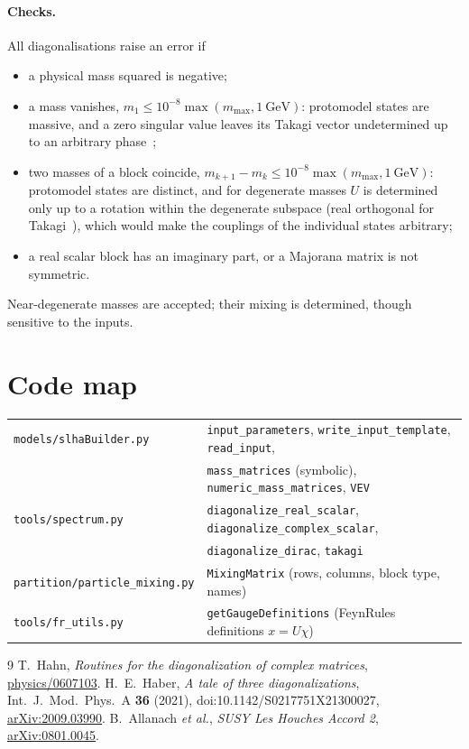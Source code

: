 \documentclass[11pt]{article}
\newcommand{\code}[1]{\texttt{#1}}
\begin{document}
\paragraph{Checks.} All diagonalisations raise an error if
\begin{itemize}
  \item a physical mass squared is negative;
  \item a mass vanishes, $m_1 \le 10^{-8}\max(m_{\max}, 1~\text{GeV})$: protomodel states are
        massive, and a zero singular value leaves its Takagi vector undetermined up to an
        arbitrary phase~\cite{Haber};
  \item two masses of a block coincide, $m_{k+1}-m_k \le 10^{-8}\max(m_{\max},1~\text{GeV})$:
        protomodel states are distinct, and for degenerate masses $U$ is determined only up to
        a rotation within the degenerate subspace (real orthogonal for Takagi~\cite{Haber}),
        which would make the couplings of the individual states arbitrary;
  \item a real scalar block has an imaginary part, or a Majorana matrix is not symmetric.
\end{itemize}
Near-degenerate masses are accepted; their mixing is determined, though sensitive to the
inputs.

\section{Code map}

\begin{center}
\begin{tabular}{ll}
\toprule
\code{models/slhaBuilder.py} & \code{input\_parameters}, \code{write\_input\_template}, \code{read\_input}, \\
                             & \code{mass\_matrices} (symbolic), \code{numeric\_mass\_matrices}, \code{VEV} \\
\code{tools/spectrum.py}     & \code{diagonalize\_real\_scalar}, \code{diagonalize\_complex\_scalar}, \\
                             & \code{diagonalize\_dirac}, \code{takagi} \\
\code{partition/particle\_mixing.py} & \code{MixingMatrix} (rows, columns, block type, names) \\
\code{tools/fr\_utils.py}    & \code{getGaugeDefinitions} (FeynRules definitions $x = U\chi$) \\
\bottomrule
\end{tabular}
\end{center}

\begin{thebibliography}{9}
 T.~Hahn, \emph{Routines for the diagonalization of complex matrices},
  \href{https://arxiv.org/abs/physics/0607103}{physics/0607103}.
 H.~E.~Haber, \emph{A tale of three diagonalizations},
  Int.\ J.\ Mod.\ Phys.\ A \textbf{36} (2021), doi:10.1142/S0217751X21300027,
  \href{https://arxiv.org/abs/2009.03990}{arXiv:2009.03990}.
 B.~Allanach \emph{et al.}, \emph{SUSY Les Houches Accord 2},
  \href{https://arxiv.org/abs/0801.0045}{arXiv:0801.0045}.
\end{thebibliography}
\end{document}
